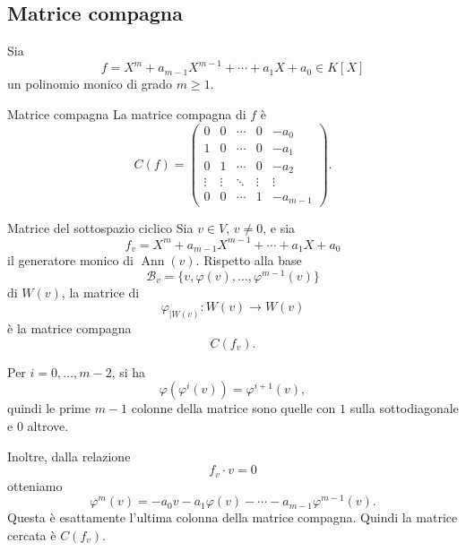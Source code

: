 \documentclass[a4paper]{article}
\begin{document}
\subsection{Matrice compagna}

\begin{radioactive}
Sia
\[
    f=X^m+a_{m-1}X^{m-1}+\cdots+a_1X+a_0\in K[X]
\]
un polinomio monico di grado \(m\geq 1\).
\end{radioactive}

\begin{radioactive}
\begin{snippetdefinition}{Matrice compagna}
    La matrice compagna di \(f\) è
    \[
        C(f)
        =
        \begin{pmatrix}
            0 & 0 & \cdots & 0 & -a_0\\
            1 & 0 & \cdots & 0 & -a_1\\
            0 & 1 & \cdots & 0 & -a_2\\
            \vdots & \vdots & \ddots & \vdots & \vdots\\
            0 & 0 & \cdots & 1 & -a_{m-1}
        \end{pmatrix}.
    \]
\end{snippetdefinition}
\end{radioactive}

\begin{radioactive}
\begin{snippetproposition}{Matrice del sottospazio ciclico}
    Sia \(v\in V\), \(v\neq 0\), e sia
    \[
        f_v=X^m+a_{m-1}X^{m-1}+\cdots+a_1X+a_0
    \]
    il generatore monico di \(\operatorname{Ann}(v)\).
    Rispetto alla base
    \[
        \mathcal{B}_v=
        \{v,\varphi(v),\ldots,\varphi^{m-1}(v)\}
    \]
    di \(W(v)\), la matrice di
    \[
        \varphi_{|W(v)}\colon W(v)\to W(v)
    \]
    è la matrice compagna
    \[
        C(f_v).
    \]
\end{snippetproposition}
\end{radioactive}

\begin{radioactive}
\begin{snippetproof}{}
    Per \(i=0,\ldots,m-2\), si ha
    \[
        \varphi(\varphi^i(v))=\varphi^{i+1}(v),
    \]
    quindi le prime \(m-1\) colonne della matrice sono quelle con \(1\) sulla sottodiagonale e \(0\) altrove.

    Inoltre, dalla relazione
    \[
        f_v\cdot v=0
    \]
    otteniamo
    \[
        \varphi^m(v)
        =
        -a_0v-a_1\varphi(v)-\cdots-a_{m-1}\varphi^{m-1}(v).
    \]
    Questa è esattamente l'ultima colonna della matrice compagna.
    Quindi la matrice cercata è \(C(f_v)\).
\end{snippetproof}
\end{radioactive}
\end{document}
